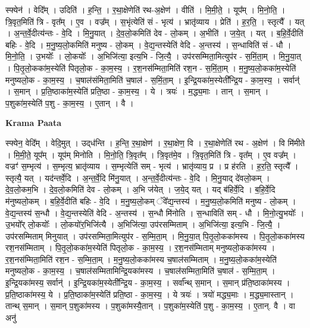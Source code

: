 \documentclass[17pt]{extarticle}
\begin{document}
स्फ्येन॑ । वेदि᳚म् । उदिति॑ । ह॒न्ति॒ । र॒था॒क्षेणेति॑ रथ-अ॒क्षेण॑ । वीति॑ । मि॒मी॒ते॒ । यूप᳚म् । मि॒नो॒ति॒ । त्रि॒वृत॒मिति॑ त्रि - वृत᳚म् । ए॒व । वज्र᳚म् । स॒भृंत्येति॑ सं - भृत्य॑ । भ्रातृ॑व्याय । प्रेति॑ । ह॒र॒ति॒ । स्तृत्यै᳚ । यत् । अ॒न्त॒र्वे॒दीत्य॑न्तः - वे॒दि । मि॒नु॒यात् । दे॒व॒लो॒कमिति॑ देव - लो॒कम् । अ॒भीति॑ । ज॒ये॒त् । यत् । ब॒हि॒र्वे॒दीति॑ बहिः - वे॒दि । म॒नु॒ष्य॒लो॒कमिति॑ मनुष्य - लो॒कम् । वे॒द्य॒न्तस्येति॑ वेदि - अ॒न्तस्य॑ । स॒न्धाविति॑ सं - धौ । मि॒नो॒ति॒ । उ॒भयोः᳚ । लो॒कयोः᳚ । अ॒भिजि॑त्या॒ इत्य॒भि - जि॒त्यै॒ । उप॑रसम्मिता॒मित्युप॑र - स॒मिं॒ता॒म् । मि॒नु॒या॒त् । पि॒तृ॒लो॒कका॑म॒स्येति॑ पितृलो॒क - का॒म॒स्य॒ । र॒श॒नस॑म्मिता॒मिति॑ रश॒न - स॒मिं॒ता॒म् । म॒नु॒ष्य॒लो॒कका॑म॒स्येति॑ मनुष्यलो॒क - का॒म॒स्य॒ । च॒षाल॑संमिता॒मिति॑ च॒षाल॑ - स॒मिं॒ता॒म् । इ॒न्द्रि॒यका॑म॒स्येती᳚न्द्रि॒य - का॒म॒स्य॒ । सर्वान्॑ । स॒मान् । प्र॒ति॒ष्ठाका॑म॒स्येति॑ प्रति॒ष्ठा - का॒म॒स्य॒ । ये । त्रयः॑ । म॒द्ध्य॒माः । तान् । स॒मान् । प॒शुका॑म॒स्येति॑ प॒शु - का॒म॒स्य॒ । ए॒तान् । वै ।  \newline


\textbf{Krama Paata} \newline

स्फ्येन॒ वेदि᳚म् । वेदि॒मुत् । उद्‌ध॑न्ति । ह॒न्ति॒ र॒था॒क्षेण॑ । र॒था॒क्षेण॒ वि । र॒था॒क्षेणेति॑ रथ - अ॒क्षेण॑ । वि मि॑मीते । मि॒मी॒ते॒ यूप᳚म् । यूप॑म् मिनोति । मि॒नो॒ति॒ त्रि॒वृत᳚म् । त्रि॒वृत॑मे॒व । त्रि॒वृत॒मिति॑ त्रि - वृत᳚म् । ए॒व वज्र᳚म् । वज्रꣳ॑ स॒म्भृत्य॑ । स॒म्भृत्य॒ भ्रातृ॑व्याय । स॒म्भृत्येति॑ सम् - भृत्य॑ । भ्रातृ॑व्याय॒ प्र । प्र ह॑रति । ह॒र॒ति॒ स्तृत्यै᳚ । स्तृत्यै॒ यत् । यद॑न्तर्वे॒दि । अ॒न्त॒र्वे॒दि मि॑नु॒यात् । अ॒न्त॒र्वे॒दीत्य॑न्तः - वे॒दि । मि॒नु॒याद् दे॑वलो॒कम् । दे॒व॒लो॒कम॒भि । दे॒व॒लो॒कमिति॑ देव - लो॒कम् । अ॒भि ज॑येत् । ज॒ये॒द् यत् । यद् ब॑हिर्वे॒दि । ब॒हि॒र्वे॒दि म॑नुष्यलो॒कम् । ब॒हि॒र्वे॒दीति॑ बहिः - वे॒दि । म॒नु॒ष्य॒लो॒कम् ॅवे᳚द्य॒न्तस्य॑ । म॒नु॒ष्य॒लो॒कमिति॑ मनुष्य - लो॒कम् । वे॒द्य॒न्तस्य॑ स॒न्धौ । वे॒द्य॒न्तस्येति॑ वेदि - अ॒न्तस्य॑ । स॒न्धौ मि॑नोति । स॒न्धाविति॑ सम् - धौ । मि॒नो॒त्यु॒भयोः᳚ । उ॒भयो᳚र् लो॒कयोः᳚ । लो॒कयो॑र॒भिजि॑त्यै । अ॒भिजि॑त्या॒ उप॑रसम्मिताम् । अ॒भिजि॑त्या॒ इत्य॒भि - जि॒त्यै॒ । उप॑रसम्मिताम् मिनुयात् । उप॑रसम्मिता॒मित्युप॑र - स॒म्मि॒ता॒म् । मि॒नु॒या॒त् पि॒तृ॒लो॒कका॑मस्य । पि॒तृ॒लो॒कका॑मस्य रश॒नस॑म्मिताम् । पि॒तृ॒लो॒कका॑म॒स्येति॑ पितृलो॒क - का॒म॒स्य॒ । र॒श॒नस॑म्मिताम् मनुष्यलो॒कका॑मस्य । र॒श॒नस॑म्मिता॒मिति॑ रश॒न - स॒म्मि॒ता॒म् । म॒नु॒ष्य॒लो॒कका॑मस्य च॒षाल॑सम्मिताम् । म॒नु॒ष्य॒लो॒कका॑म॒स्येति॑ मनुष्यलो॒क - का॒म॒स्य॒ । च॒षाल॑सम्मितामिन्द्रि॒यका॑मस्य । च॒षाल॑सम्मिता॒मिति॑ च॒षाल॑ - स॒म्मि॒ता॒म् । इ॒न्द्रि॒यका॑मस्य॒ सर्वान्॑ । इ॒न्द्रि॒यका॑म॒स्येती᳚न्द्रि॒य - का॒म॒स्य॒ । सर्वा᳚न्थ् स॒मान् । स॒मान् प्र॑ति॒ष्ठाका॑मस्य । प्र॒ति॒ष्ठाका॑मस्य॒ ये । प्र॒ति॒ष्ठाका॑म॒स्येति॑ प्रति॒ष्ठा - का॒म॒स्य॒ । ये त्रयः॑ । त्रयो॑ मद्ध्य॒माः । म॒द्ध्य॒मास्तान् । तान्थ् स॒मान् । स॒मान् प॒शुका॑मस्य । प॒शुका॑मस्यै॒तान् । प॒शुका॑म॒स्येति॑ प॒शु - का॒म॒स्य॒ । ए॒तान्. वै । वा अनु॑ \newline
\end{document}

